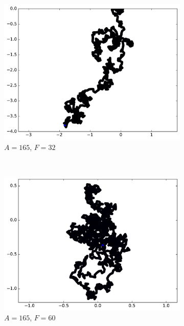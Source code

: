 \begin{figure}[htb]
\begin{subfigure}[t]{\subImgWmo}
			\includegraphics[width=\textwidth]{figures/ch3/synTraj_219_165_32}
			\caption[$A = 165$, $F=32$]{$A = 165$, $F=32$}
			\label{fig:synTraj_219_165_32}
		\end{subfigure}
		~
		\begin{subfigure}[t]{\subImgWmo}
			\centering
			\includegraphics[width=\textwidth]{figures/ch3/synTraj_219_165_60}
			\caption[$A = 165$, $F=60$]{$A = 165$, $F=60$}
			\label{fig:synTraj_219_165_60}
		\end{subfigure}
		~
		\begin{subfigure}[t]{\subImgWmo}
			\centering

\end{subfigure}
\end{figure}
